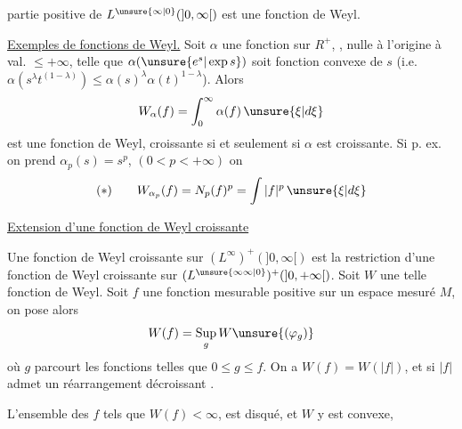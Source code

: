 partie positive de $L^{\unsure{\infty|0}}(]0,\infty[)$  est une fonction de Weyl.

\uline{Exemples de fonctions de Weyl.} Soit $\alpha$ une fonction sur $R^+$, , nulle à l'origine à val. $\leq +\infty$,  telle que $\alpha(\unsure{e^s|\exp s})$ soit fonction convexe de $s$ (i.e. $\alpha(s^\lambda t^{(1-\lambda)})\leq\alpha(s)^\lambda\alpha(t)^{1-\lambda}$). Alors
\[
W_\alpha(f)=\int_0^\infty\alpha(f)\,\unsure{\xi|d\xi}
\]
est une fonction de Weyl, croissante si et seulement si $\alpha$ est croissante. Si p. ex. on prend $\alpha_p(s)=s^p$, $(0<p<+\infty)$ on 
\[
(*)\qquad W_{\alpha_p}(f)=N_p(f)^p=\int|f|^p\,\unsure{\xi|d\xi}
\]

\uline{Extension d'une fonction de Weyl croissante}

Une fonction de Weyl croissante sur $(L^\infty)^+(]0,\infty[)$ est  la restriction d'une fonction de Weyl croissante sur $(L^{\unsure{\infty\infty|0}})^+(]0,+\infty[)$.  Soit $W$ une telle fonction de Weyl. Soit $f$ une fonction mesurable positive sur un espace mesuré $M$, on  pose alors
\[
W(f)=\mathop{\rm Sup}_g W\unsure{(\varphi_g)}
\]
où $g$ parcourt les fonctions   telles que $0\leq g\leq f$. On a  $W(f)=W(|f|)$, et si $|f|$ admet un réarrangement décroissant .

L'ensemble des $f$ tels que $W(f)<\infty$, est  disqué, et $W$ y est convexe,
